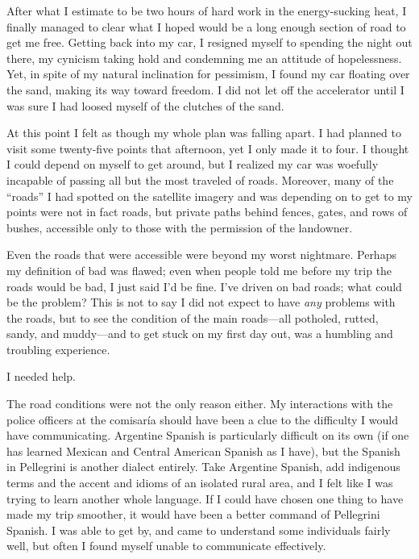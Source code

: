 After what I estimate to be two hours of hard work in the energy-sucking heat, I finally managed to clear what I hoped would be a long enough section of road to get me free. Getting back into my car, I resigned myself to spending the night out there, my cynicism taking hold and condemning me an attitude of hopelessness. Yet, in spite of my natural inclination for pessimism, I found my car floating over the sand, making its way toward freedom. I did not let off the accelerator until I was sure I had loosed myself of the clutches of the sand.

At this point I felt as though my whole plan was falling apart. I had planned to visit some twenty-five points that afternoon, yet I only made it to four. I thought I could depend on myself to get around, but I realized my car was woefully incapable of passing all but the most traveled of roads. Moreover, many of the “roads” I had spotted on the satellite imagery and was depending on to get to my points were not in fact roads, but private paths behind fences, gates, and rows of bushes, accessible only to those with the permission of the landowner.

Even the roads that were accessible were beyond my worst nightmare. Perhaps my definition of bad was flawed; even when people told me before my trip the roads would be bad, I just said I’d be fine. I’ve driven on bad roads; what could be the problem? This is not to say I did not expect to have \textit{any} problems with the roads, but to see the condition of the main roads---all potholed, rutted, sandy, and muddy---and to get stuck on my first day out, was a humbling and troubling experience.

I needed help.

The road conditions were not the only reason either. My interactions with the police officers at the comisaría should have been a clue to the difficulty I would have communicating. Argentine Spanish is particularly difficult on its own (if one has learned Mexican and Central American Spanish as I have), but the Spanish in Pellegrini is another dialect entirely. Take Argentine Spanish, add indigenous terms and the accent and idioms of an isolated rural area, and I felt like I was trying to learn another whole language. If I could have chosen one thing to have made my trip smoother, it would have been a better command of Pellegrini Spanish. I was able to get by, and came to understand some individuals fairly well, but often I found myself unable to communicate effectively.

